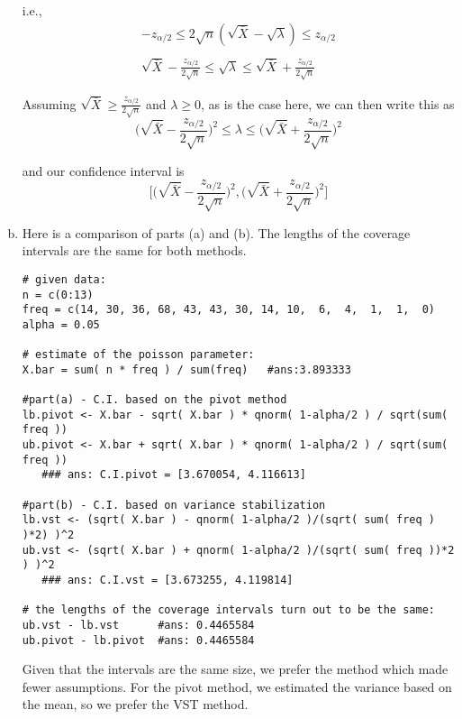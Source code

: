 \documentclass[12pt]{article}
\begin{document}
\begin{enumerate}[(a)]
i.e., 
\begin{align*}
-z_{\alpha/2} \leq  2\sqrt{n}(\sqrt{ \bar X} - \sqrt{\lambda})   \leq z_{\alpha/2} \\
\\
\sqrt{ \bar X}  - \frac{z_{\alpha/2}}{2\sqrt n}  \leq  \sqrt{\lambda}   \leq \sqrt{ \bar X}  + \frac{z_{\alpha/2}}{2\sqrt n}
\end{align*}

Assuming $\sqrt{ \bar X } \geq \frac{z_{\alpha/2}}{2\sqrt n}$ and $\lambda \geq 0$, as is the case here, we can then write this as
$$\Big(\sqrt{ \bar X}  - \frac{z_{\alpha/2}}{2\sqrt n}\Big)^2  \leq  \lambda   \leq \Big(\sqrt{ \bar X} + \frac{z_{\alpha/2}}{2\sqrt n}\Big)^2$$

and our confidence interval is $$\Big[\Big(\sqrt{ \bar X}  - \frac{z_{\alpha/2}}{2\sqrt n}\Big)^2 ,  \Big(\sqrt{ \bar X}  + \frac{z_{\alpha/2}}{2\sqrt n}\Big)^2\Big]$$

\item

Here is a comparison of parts (a) and (b). The lengths of the coverage intervals are the same for both methods.

\begin{lstlisting}
# given data:
n = c(0:13)
freq = c(14, 30, 36, 68, 43, 43, 30, 14, 10,  6,  4,  1,  1,  0)
alpha = 0.05

# estimate of the poisson parameter:
X.bar = sum( n * freq ) / sum(freq)   #ans:3.893333

#part(a) - C.I. based on the pivot method
lb.pivot <- X.bar - sqrt( X.bar ) * qnorm( 1-alpha/2 ) / sqrt(sum( freq ))
ub.pivot <- X.bar + sqrt( X.bar ) * qnorm( 1-alpha/2 ) / sqrt(sum( freq ))
   ### ans: C.I.pivot = [3.670054, 4.116613]

#part(b) - C.I. based on variance stabilization
lb.vst <- (sqrt( X.bar ) - qnorm( 1-alpha/2 )/(sqrt( sum( freq ) )*2) )^2 
ub.vst <- (sqrt( X.bar ) + qnorm( 1-alpha/2 )/(sqrt( sum( freq ))*2 ) )^2  
   ### ans: C.I.vst = [3.673255, 4.119814]

# the lengths of the coverage intervals turn out to be the same:
ub.vst - lb.vst      #ans: 0.4465584
ub.pivot - lb.pivot  #ans: 0.4465584
\end{lstlisting}

Given that the intervals are the same size, we prefer the method which made fewer assumptions. For the pivot method, we estimated the variance based on the mean, so we prefer the VST method.
\end{enumerate}
  
\end{document}
